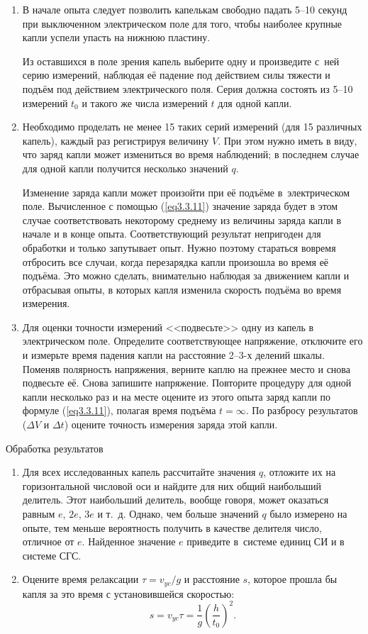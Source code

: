 \begin{enumerate}
\item{ В начале опыта следует позволить капелькам свободно падать \mbox{5--10} секунд при выключенном электрическом поле для того, чтобы наиболее крупные капли успели упасть на нижнюю пластину.

Из оставшихся в поле зрения капель выберите одну и произведите с~ней серию измерений, наблюдая её падение под действием силы тяжести и подъём под действием электрического поля. Серия должна состоять из 5--10 измерений $t_0$ и такого же числа измерений $t$ для одной капли.}

\item{ Необходимо проделать не менее 15 таких серий измерений (для 15 различных капель), каждый раз регистрируя величину $V$. При этом нужно иметь в виду, что заряд капли может измениться во время наблюдений; в последнем случае для одной капли получится несколько значений $q$.

Изменение заряда капли может произойти при её подъёме в~электрическом поле. Вычисленное с помощью (\ref{eq3.3.11}) значение заряда будет в этом случае соответствовать некоторому среднему из величины заряда капли в начале и в конце опыта. Соответствующий результат непригоден для обработки и только запутывает опыт. Нужно поэтому стараться вовремя отбросить все случаи, когда перезарядка капли произошла во время её подъёма. Это можно сделать, внимательно наблюдая за движением капли и отбрасывая опыты, в которых капля изменила скорость подъёма во время измерения.}

\item{ Для оценки точности измерений <<подвесьте>> одну из капель в электрическом поле. Определите соответствующее напряжение, отключите его  и измерьте время падения капли на расстояние \mbox{2--3-х} делений шкалы. Поменяв полярность напряжения, верните каплю на прежнее место и снова подвесьте её. Снова запишите напряжение. Повторите  процедуру  для одной капли несколько раз  и на месте  оцените из этого опыта заряд капли по формуле (\ref{eq3.3.11}), полагая время подъёма $t=\infty$. По разбросу результатов ($\Delta V$ и  $\Delta t$) оцените точность измерения заряда этой капли.}

\end{enumerate}


{\rm Обработка результатов}
\begin{enumerate}

\item{ Для всех исследованных капель рассчитайте значения $q$, отложите их на горизонтальной числовой оси и найдите для них общий наибольший делитель. Этот наибольший делитель, вообще говоря, может оказаться равным $e$, $2e$, $3e$ и т.~д.
Однако, чем больше значений $q$ было измерено на опыте, тем меньше вероятность получить в качестве делителя число,
отличное от $e$. Найденное значение $e$ приведите в~системе единиц СИ и в системе СГС.}

\item{ Оцените время релаксации $\tau=v_{yc}/g$ и расстояние $s$, которое прошла бы капля за это время с установившейся скоростью:
$$
s=v_{yc}\tau=\frac{1}{g}\left(\frac{h}{t_0}\right)^2.
$$}

\end{enumerate}

